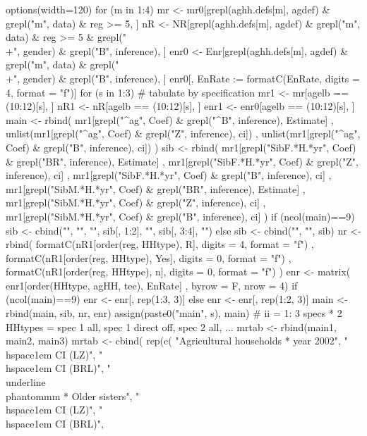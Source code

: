 \begin{Schunk}
\begin{Sinput}
options(width=120)
for (m in 1:4) {
    mr <- mr0[grepl(aghh.defs[m], agdef) & grepl("m", data) & reg >= 5, ]
    nR <- NR[grepl(aghh.defs[m], agdef) & grepl("m", data) & reg >= 5
      & grepl("\\+", gender) & grepl("B", inference), ]
    enr0 <- Enr[grepl(aghh.defs[m], agdef) & grepl("m", data)
      & grepl("\\+", gender) & grepl("B", inference), ]
    enr0[, EnRate := formatC(EnRate, digits = 4, format = "f")]
  for (s in 1:3) {
    # tabulate by specification
    mr1 <- mr[agelb == (10:12)[s], ]
    nR1 <- nR[agelb == (10:12)[s], ]
    enr1 <- enr0[agelb == (10:12)[s], ]
    main <- rbind(
      mr1[grepl("^ag", Coef) & grepl("^B", inference), Estimate]
      ,
      unlist(mr1[grepl("^ag", Coef) & grepl("Z", inference), ci])
      ,
      unlist(mr1[grepl("^ag", Coef) & grepl("B", inference), ci])
    )
    sib <-  rbind(
       mr1[grepl("SibF.*H.*yr", Coef) & grepl("BR", inference), Estimate]
       , 
       mr1[grepl("SibF.*H.*yr", Coef) & grepl("Z", inference), ci]
       ,
       mr1[grepl("SibF.*H.*yr", Coef) & grepl("B", inference), ci]
       ,
       mr1[grepl("SibM.*H.*yr", Coef) & grepl("BR", inference), Estimate]
       , 
       mr1[grepl("SibM.*H.*yr", Coef) & grepl("Z", inference), ci]
       ,
       mr1[grepl("SibM.*H.*yr", Coef) & grepl("B", inference), ci]
     )
     if (ncol(main)==9) 
       sib <- cbind("", "", "", sib[, 1:2], "", sib[, 3:4], "") else
       sib <- cbind("", "", sib)
     nr <- rbind(
        formatC(nR1[order(reg, HHtype), R], digits = 4, format = "f")
      , formatC(nR1[order(reg, HHtype), Yes], digits = 0, format = "f")
      , formatC(nR1[order(reg, HHtype), n], digits = 0, format = "f")
     )
     enr <- matrix(
       enr1[order(HHtype, agHH, tee), EnRate]
       , byrow = F, nrow = 4)
     if (ncol(main)==9) enr <- enr[, rep(1:3, 3)] else enr <- enr[, rep(1:2, 3)]
     main <- rbind(main, sib, nr, enr)
     assign(paste0("main", s), main)
  }
  # ii = 1: 3 specs * 2 HHtypes = spec 1 all, spec 1 direct off, spec 2 all, ...
  mrtab <- rbind(main1, main2, main3)
  mrtab <- 
    cbind(
        rep(c(
          "Agricultural households * year 2002", 
          "\\hspace{1em} CI (LZ)", "\\hspace{1em} CI (BRL)", 
          "\\underline{\\phantom{mm}} * Older sisters",
          "\\hspace{1em} CI (LZ)", "\\hspace{1em} CI (BRL)", 
}
\end{Sinput}
\end{Schunk}
